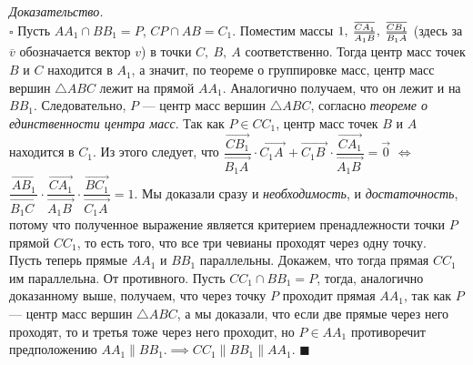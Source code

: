 \documentclass[14pt]{extarticle}
\let\Overrightarrow\overrightarrow
\theoremstyle{definition}
\theoremstyle{theorem}
\renewenvironment{proof}
    {\noindent \textit{Доказательство.}\\
	\indent $\square$}
	{ $\blacksquare$\\ }
\begin{document}
\begin{figure}
	\hspace{-0.3cm}
	\vspace{-0.6cm}
	\vspace{-1cm}
\end{figure}

\begin{proof}
    Пусть $AA_1 \cap BB_1 = P$, $CP \cap AB = C_1$. 
	Поместим массы $1, \: \frac{\overline{CA_1}}{\vphantom
	{\overline{AB'}}\overline{A_1B}}, 
	\: \frac{\overline{CB_1}}{\vphantom
	{\overline{AB'}}\overline{B_1A}}$ (здесь за $\overline{v}$
	обозначается вектор $v$)
	в точки $C, \: B, \: A$ соответственно. Тогда центр масс точек
	$B$ и $C$ находится в $A_1$, а значит, по теореме о группировке
	масс, центр масс вершин $\triangle ABC$ лежит на прямой $AA_1$.
	Аналогично получаем, что он лежит и на $BB_1$. Следовательно,
	$P$ --- центр масс вершин $\triangle ABC$, согласно 
	\textit{теореме о единственности центра масс}. 
	Так как $P \in CC_1$, центр масс точек $B$ и $A$ находится в $C_1$.
	Из этого следует, что $\dfrac{\Overrightarrow{CB_1}}
	{\Overrightarrow{B_1A_{\,}}} \cdot \Overrightarrow{C_1A_{\,}} +
	\Overrightarrow{C_1B_{\:}} \cdot
	\dfrac{\Overrightarrow{CA_1}}{\Overrightarrow{A_1B_{\:}}} = \vec{0}$
    $\iff$ 
	$
	\dfrac{\Overrightarrow{AB_1}}{\Overrightarrow{B_1C_{\, \,}}} \cdot 
	\dfrac{\Overrightarrow{CA_1}}
	{\Overrightarrow{A_1B_{\:}}} \cdot \dfrac{\Overrightarrow{BC_1}}
	{\Overrightarrow{C_1A_{\,}}} = 1$.
	Мы доказали сразу и \textit{необходимость}, и \textit{достаточность},
	потому что полученное выражение является критерием пренадлежности точки
	$P$ прямой $CC_1$, то есть
	того, что все три чевианы проходят через одну точку.\\
    
	Пусть теперь  прямые $AA_1$ и $BB_1$ параллельны. Докажем, что 
	тогда прямая $CC_1$ им параллельна. От противного. Пусть
	$CC_1 \cap BB_1 = P$, тогда, аналогично доказанному выше, получаем, что
	через точку $P$ проходит прямая $AA_1$, так как $P$ --- центр масс
	вершин $\triangle ABC$, а мы доказали, что если две прямые
	через него проходят, то и третья тоже через него проходит,
	но $P \in AA_1$  противоречит предположению
	$AA_1 \parallel BB_1. \implies CC_1 \parallel BB_1 \parallel AA_1$.
\end{proof}
\end{document}
